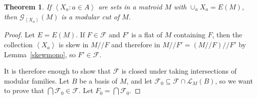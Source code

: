 \documentclass{amsart}
\theoremstyle{plain}
\newtheorem{theorem}{Theorem}[section]
\theoremstyle{definition}
\newcommand{\cF}{\mathcal{F}}
\newcommand{\cL}{\mathcal{L}}
\newcommand{\dcon}{/ \!\! /}
\newcommand{\ab}[1]{\left\langle#1\right\rangle}
\renewcommand{\ss}{\subseteq}
\newcommand{\gutscut}[2]{{\mathcal{G}}_{#2}(#1)}
\begin{document}
\begin{theorem}\label{gutscut}
  If $\ab{X_a : a \in A}$ are sets in a matroid $M$ with $\cup_a X_a = E(M)$, then $\gutscut{M}{\ab{X_a}}$ is a modular cut of $M$. 
\end{theorem}
\begin{proof}
  Let $E = E(M)$. 
  If $F \in \cF$ and $F'$ is a flat of $M$ containing $F$, 
  then the collection $\ab{X_a}$ is skew in $M \dcon F$ and therefore in $M \dcon F' = (M \dcon F) \dcon F'$ by
  Lemma~\ref{skewmono}, so $F' \in \cF$. 

  It is therefore enough to show that $\cF$ is closed under taking intersections of modular families. 
  Let $B$ be a basis of $M$, and let $\cF_0 \ss \cF \cap \cL_M(B)$, so we want to prove that $\bigcap \cF_0 \in \cF$. 
  Let $F_0 = \bigcap \cF_0$. 


\end{proof}
\end{document}
